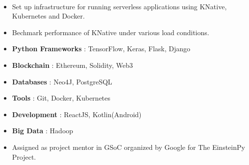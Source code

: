 \documentclass[10pt,a4paper,ragged2e]{altacv}
\begin{document}
\divider
\\
\begin{itemize}
\item Set up infrastructure for running serverless applications using KNative, Kubernetes and Docker.
\item Bechmark performance of KNative under various load conditions.
\end{itemize}





\begin{itemize}
\item \textbf{Python Frameworks} : TensorFlow, Keras, Flask, Django
\item \textbf{Blockchain} : Ethereum, Solidity, Web3
\item \textbf{Databases} : Neo4J, PostgreSQL
\item \textbf{Tools} : Git, Docker, Kubernetes
\item \textbf{Development} : ReactJS, Kotlin(Android)
\item \textbf{Big Data} : Hadoop
\end{itemize}




\begin{itemize}
\item Assigned as project mentor in GSoC organized by Google for The EinsteinPy Project.
\end{itemize}



\end{document}
